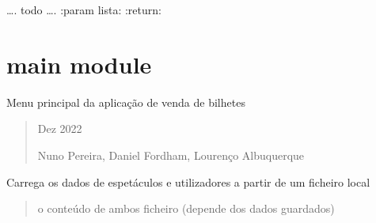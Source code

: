 \documentclass[letterpaper,10pt,portuges]{sphinxmanual}
\begin{document}
\begin{fulllineitems}
\label{\detokenize{io_terminal:io_terminal.imprime_lista_de_dicionarios}}
\pysigstartsignatures
{}
\pysigstopsignatures
\sphinxAtStartPar
…. todo ….
:param lista:
:return:

\end{fulllineitems}


\sphinxstepscope


\section{main module}
\label{\detokenize{main:module-main}}\label{\detokenize{main:main-module}}\label{\detokenize{main::doc}}
\sphinxAtStartPar
Menu principal da aplicação de venda de bilhetes
\begin{quote}\begin{description}
 Dez 2022


\sphinxAtStartPar
Nuno Pereira, Daniel Fordham, Lourenço Albuquerque

\end{description}\end{quote}

\begin{fulllineitems}
\label{\detokenize{main:main.carregar_dados}}
\pysigstartsignatures
{}
\pysigstopsignatures
\sphinxAtStartPar
Carrega os dados de espetáculos e utilizadores a partir de um ficheiro local
\begin{quote}\begin{description}
\sphinxAtStartPar
o conteúdo de ambos ficheiro (depende dos dados guardados)

\end{description}\end{quote}

\end{fulllineitems}
\end{document}
